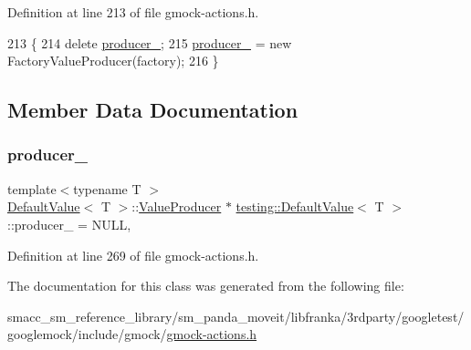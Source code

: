 Definition at line 213 of file gmock-\/actions.\+h.


\begin{DoxyCode}
213                                                   \{
214     \textcolor{keyword}{delete} \hyperlink{classtesting_1_1DefaultValue_a69d60d7538ccf71d9f47164320a3bf28}{producer\_};
215     \hyperlink{classtesting_1_1DefaultValue_a69d60d7538ccf71d9f47164320a3bf28}{producer\_} = \textcolor{keyword}{new} FactoryValueProducer(factory);
216   \}
\end{DoxyCode}


\subsection{Member Data Documentation}
\mbox{\label{classtesting_1_1DefaultValue_a69d60d7538ccf71d9f47164320a3bf28}} 
\subsubsection{\texorpdfstring{producer\+\_\+}{producer\_}}
{\footnotesize\ttfamily template$<$typename T $>$ \\
\hyperlink{classtesting_1_1DefaultValue}{Default\+Value}$<$ T $>$\+::\hyperlink{classtesting_1_1DefaultValue_1_1ValueProducer}{Value\+Producer} $\ast$ \hyperlink{classtesting_1_1DefaultValue}{testing\+::\+Default\+Value}$<$ T $>$\+::producer\+\_\+ = N\+U\+LL\hspace{0.3cm}{\ttfamily [static]}, {\ttfamily [private]}}



Definition at line 269 of file gmock-\/actions.\+h.



The documentation for this class was generated from the following file\+:\begin{DoxyCompactItemize}
\item 
smacc\+\_\+sm\+\_\+reference\+\_\+library/sm\+\_\+panda\+\_\+moveit/libfranka/3rdparty/googletest/googlemock/include/gmock/\hyperlink{gmock-actions_8h}{gmock-\/actions.\+h}\end{DoxyCompactItemize}
